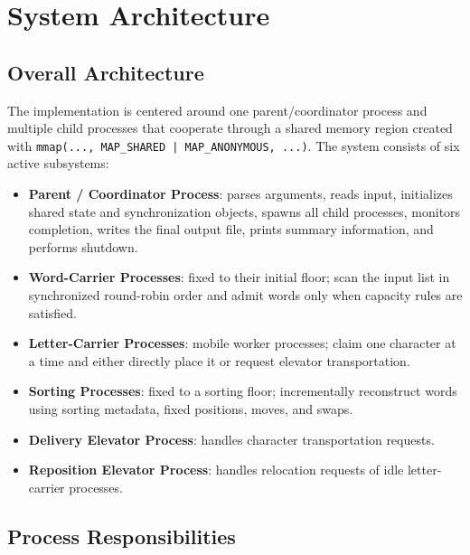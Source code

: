 \documentclass[12pt,a4paper]{article}
\begin{document}
\section{System Architecture}

\subsection{Overall Architecture}

The implementation is centered around one parent/coordinator process and multiple child processes that cooperate through a shared memory region created with \texttt{mmap(..., MAP\_SHARED | MAP\_ANONYMOUS, ...)}. The system consists of six active subsystems:

\begin{itemize}[leftmargin=1.5em]
\item \textbf{Parent / Coordinator Process}: parses arguments, reads input, initializes shared state and synchronization objects, spawns all child processes, monitors completion, writes the final output file, prints summary information, and performs shutdown.
\item \textbf{Word-Carrier Processes}: fixed to their initial floor; scan the input list in synchronized round-robin order and admit words only when capacity rules are satisfied.
\item \textbf{Letter-Carrier Processes}: mobile worker processes; claim one character at a time and either directly place it or request elevator transportation.
\item \textbf{Sorting Processes}: fixed to a sorting floor; incrementally reconstruct words using sorting metadata, fixed positions, moves, and swaps.
\item \textbf{Delivery Elevator Process}: handles character transportation requests.
\item \textbf{Reposition Elevator Process}: handles relocation requests of idle letter-carrier processes.
\end{itemize}

\subsection{Process Responsibilities}
\end{document}
